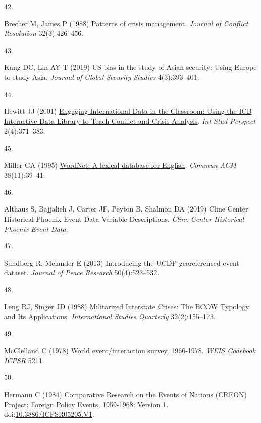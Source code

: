 \documentclass{article}
\newlength{\cslhangindent}
\newlength{\csllabelwidth}
\newlength{\cslentryspacingunit} %
\newenvironment{CSLReferences}[2] %
 {%
  \setlength{\parindent}{0pt}
  \ifodd #1
  \let\oldpar\par
  \def\par{\hangindent=\cslhangindent\oldpar}
  \fi
  \setlength{\parskip}{#2\cslentryspacingunit}
 }%
 {}
\newcommand{\CSLLeftMargin}[1]{\parbox[t]{\csllabelwidth}{#1}}
\newcommand{\CSLRightInline}[1]{\parbox[t]{\linewidth - \csllabelwidth}{#1}\break}
\begin{document}
\begin{CSLReferences}{0}{0}
\leavevmode{}%
\CSLLeftMargin{42. }
\CSLRightInline{Brecher M, James P (1988) Patterns of crisis management.
\emph{Journal of Conflict Resolution} 32(3):426--456.}

\leavevmode{}%
\CSLLeftMargin{43. }
\CSLRightInline{Kang DC, Lin AY-T (2019) {US} bias in the study of
{Asian} security: {Using Europe} to study {Asia}. \emph{Journal of
Global Security Studies} 4(3):393--401.}

\leavevmode{}%
\CSLLeftMargin{44. }
\CSLRightInline{Hewitt JJ (2001)
\href{https://doi.org/10.1111/1528-3577.00066}{Engaging {International
Data} in the {Classroom}: {Using} the {ICB Interactive Data Library} to
{Teach Conflict} and {Crisis Analysis}}. \emph{Int Stud Perspect}
2(4):371--383.}

\leavevmode{}%
\CSLLeftMargin{45. }
\CSLRightInline{Miller GA (1995)
\href{https://doi.org/10.1145/219717.219748}{{WordNet}: A lexical
database for {English}}. \emph{Commun ACM} 38(11):39--41.}

\leavevmode{}%
\CSLLeftMargin{46. }
\CSLRightInline{Althaus S, Bajjalieh J, Carter JF, Peyton B, Shalmon DA
(2019) Cline {Center Historical Phoenix Event Data Variable
Descriptions}. \emph{Cline Center Historical Phoenix Event Data}.}

\leavevmode{}%
\CSLLeftMargin{47. }
\CSLRightInline{Sundberg R, Melander E (2013) Introducing the {UCDP}
georeferenced event dataset. \emph{Journal of Peace Research}
50(4):523--532.}

\leavevmode{}%
\CSLLeftMargin{48. }
\CSLRightInline{Leng RJ, Singer JD (1988)
\href{https://doi.org/10.2307/2600625}{Militarized {Interstate Crises}:
{The BCOW Typology} and {Its Applications}}. \emph{International Studies
Quarterly} 32(2):155--173.}

\leavevmode{}%
\CSLLeftMargin{49. }
\CSLRightInline{McClelland C (1978) World event/interaction survey,
1966-1978. \emph{WEIS Codebook ICPSR} 5211.}

\leavevmode{}%
\CSLLeftMargin{50. }
\CSLRightInline{Hermann C (1984) Comparative {Research} on the {Events}
of {Nations} ({CREON}) {Project}: {Foreign Policy Events}, 1959-1968:
{Version} 1.
doi:\href{https://doi.org/10.3886/ICPSR05205.V1}{10.3886/ICPSR05205.V1}.}


\end{CSLReferences}
\end{document}
